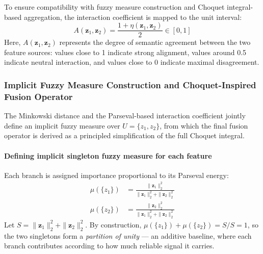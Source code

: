 \documentclass[preprint,12pt]{elsarticle}
\begin{document}
To ensure compatibility with fuzzy measure construction and Choquet integral-based aggregation, the interaction coefficient is mapped to the unit interval: 
\begin{equation*}
    A(\mathbf{z}_1, \mathbf{z}_2) = \frac{1 + \eta(\mathbf{z}_1, \mathbf{z}_2)}{2} \in [0, 1]
    \label{eq:alignment}
\end{equation*}
Here, $A(\mathbf{z}_1, \mathbf{z}_2)$ represents the degree of semantic agreement between the two feature sources: values close to 1 indicate strong alignment, values around 0.5 indicate neutral interaction, and values close to 0 indicate maximal disagreement.

\subsubsection{Implicit Fuzzy Measure Construction and Choquet-Inspired Fusion Operator}

The Minkowski distance and the Parseval-based interaction coefficient jointly define an implicit fuzzy measure over $U = \{z_1, z_2\}$, from which the final fusion operator is derived as a principled simplification of the full Choquet integral.

\paragraph{Defining implicit singleton fuzzy measure for each feature }
Each branch is assigned importance proportional to its Parseval energy:
\begin{align*}
    \mu(\{z_1\}) &= \frac{\|\mathbf{z}_1\|_2^2}{\|\mathbf{z}_1\|_2^2 + \|\mathbf{z}_2\|_2^2} \\[6pt]
    \mu(\{z_2\}) &= \frac{\|\mathbf{z}_2\|_2^2}{\|\mathbf{z}_1\|_2^2 + \|\mathbf{z}_2\|_2^2}
\end{align*}
Let $S = \|\mathbf{z}_1\|_2^2 + \|\mathbf{z}_2\|_2^2$. By construction, $\mu(\{z_1\}) + \mu(\{z_2\}) = S/S = 1$, so the two singletons form a \emph{partition of unity} — an additive baseline, where each branch contributes according to how much reliable signal it carries.
\end{document}
